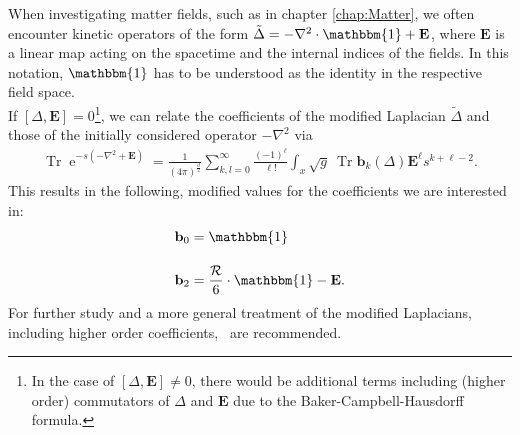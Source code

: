 When investigating matter fields, such as in chapter \ref{chap:Matter}, we often encounter kinetic operators of the form $\tilde{\Delta} = -\nabla^2\cdot\mathbbm{1} +  \mathbf{E}$, where $\mathbf{E}$ is a linear map acting on the spacetime and the internal indices of the fields. In this notation, $\mathbbm{1}$ has to be understood as the identity in the respective field space. \\
If $\left[\Delta, \mathbf{E}\right] = 0$\footnote{In the case of $\left[\Delta, \mathbf{E}\right] \neq 0$, there would be additional terms including (higher order) commutators of $\Delta$ and $\mathbf{E}$ due to the Baker-Campbell-Hausdorff formula.}, we can relate the coefficients of the modified Laplacian $\tilde{\Delta}$ and those of the initially considered operator $-\nabla^2$ via
\begin{align}
	\operatorname{Tr} \operatorname{e}^{-s\left(-\nabla^{2}+\mathbf{E}\right)}=\frac{1}{(4 \pi)^{\frac{d}{2}}} \sum_{k, l=0}^{\infty} \frac{(-1)^{\ell}}{\ell !} \int_x \sqrt{g} \ \operatorname{Tr} \mathbf{b}_{k}(\Delta) \mathbf{E}^{\ell} s^{k+\ell-2}.
\end{align}
This results in the following, modified values for the coefficients we are interested in:
\begin{equation}
\begin{aligned}
	\mathbf{b}_0 &= \mathbbm{1} \\[10pt]
	\mathbf{b}_2 &= \frac{\mathcal{R}}{6}\cdot\mathbbm{1} - \mathbf{E}.
	\label{eqn:coefficients}
\end{aligned}	
\end{equation}
For further study and a more general treatment of the modified Laplacians, including higher order coefficients,\ \cite{CodelloPercacciRahmede2008, Percacci2017} are recommended.